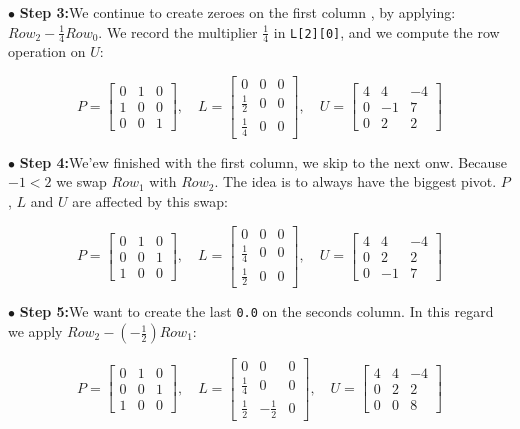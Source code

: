 $\bullet$ {\bf Step 3:}\quad We continue to create zeroes on the first column , by applying: $Row_2 - \frac{1}{4} Row_0$. We record the multiplier $\frac{1}{4}$ in {\tt L[2][0]}, and we compute the row operation on $U$:

$$
P=
\begin{bmatrix}
0 & 1 & 0 \\
1 & 0 & 0 \\
0 & 0 & 1  
\end{bmatrix}
, \quad
L =
\begin{bmatrix}
0 & 0 & 0 \\
\frac{1}{2} & 0 & 0 \\
\frac{1}{4} & 0 & 0  
\end{bmatrix}
, \quad
U =
\begin{bmatrix}
4 & 4 & -4 \\
0 & -1 & 7 \\
0 & 2 & 2  
\end{bmatrix}
$$

$\bullet$ {\bf Step 4:}\quad We'ew finished with the first column, we skip to the next onw. Because $-1 < 2$ we swap $Row_1$ with $Row_2$. The idea is to always have the biggest pivot. $P$, $L$ and $U$ are affected by this swap:

$$
P=
\begin{bmatrix}
0 & 1 & 0 \\
0 & 0 & 1 \\
1 & 0 & 0 
\end{bmatrix}
, \quad
L =
\begin{bmatrix}
0 & 0 & 0 \\
\frac{1}{4} & 0 & 0 \\
\frac{1}{2} & 0 & 0 
\end{bmatrix}
, \quad 
U =
\begin{bmatrix}
4 & 4 & -4 \\
0 & 2 & 2  \\
0 & -1 & 7 
\end{bmatrix}
$$

$\bullet$ {\bf Step 5:}\quad We want to create the last {\tt 0.0} on the seconds column. In this regard we apply $Row_2 - \left(-\frac{1}{2}\right) Row_1$:

$$
P=
\begin{bmatrix}
0 & 1 & 0 \\
0 & 0 & 1 \\
1 & 0 & 0
\end{bmatrix}
, \quad 
L =
\begin{bmatrix}
0 & 0 & 0 \\
\frac{1}{4} & 0 & 0 \\
\frac{1}{2} & -\frac{1}{2} & 0
\end{bmatrix}
, \quad 
U =
\begin{bmatrix}
4 & 4 & -4 \\
0 & 2 & 2  \\
0 & 0 & 8
\end{bmatrix}
$$

